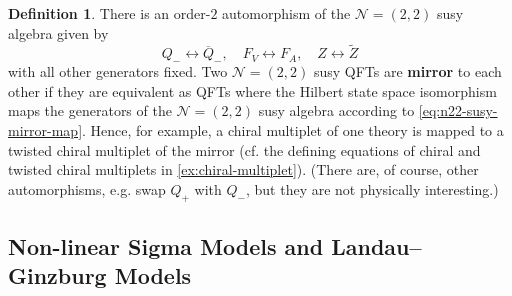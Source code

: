 \documentclass{report}
\theoremstyle{plain}
\theoremstyle{definition}
\newtheorem{definition}[theorem]{Definition}
\theoremstyle{remark}
\newcommand{\cN}{\mathcal{N}}
\newcommand{\cnj}{\overline}
\begin{document}
\begin{definition}
  There is an order-$2$ automorphism of the $\cN=(2,2)$ susy algebra
  given by
  \begin{equation} \label{eq:n22-susy-mirror-map}
    Q_- \longleftrightarrow \cnj Q_-, \quad F_V \longleftrightarrow F_A, \quad Z \longleftrightarrow \tilde Z
  \end{equation}
  with all other generators fixed. Two $\cN=(2,2)$ susy QFTs are {\bf
    mirror} to each other if they are equivalent as QFTs where the
  Hilbert state space isomorphism maps the generators of the
  $\cN=(2,2)$ susy algebra according to \eqref{eq:n22-susy-mirror-map}.
  Hence, for example, a chiral multiplet of one theory is mapped to a
  twisted chiral multiplet of the mirror (cf. the defining equations
  of chiral and twisted chiral multiplets in
  \ref{ex:chiral-multiplet}). (There are, of course, other
  automorphisms, e.g. swap $Q_+$ with $Q_-$, but they are not
  physically interesting.)
\end{definition}

\subsection{Non-linear Sigma Models and Landau--Ginzburg Models}
\end{document}
